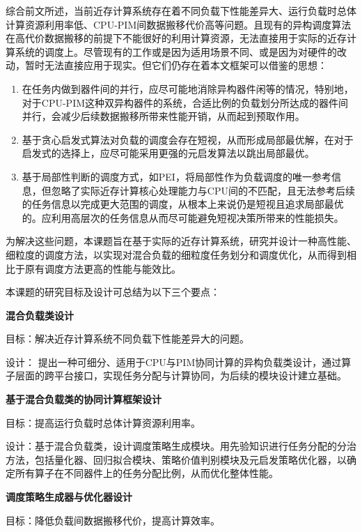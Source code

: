     综合前文所述，当前近存计算系统存在着不同负载下性能差异大、运行负载时总体计算资源利用率低、CPU-PIM间数据搬移代价高等问题。且现有的异构调度算法在高代价数据搬移的前提下不能很好的利用计算资源，无法直接用于实际的近存计算系统的调度上。尽管现有的工作或是因为适用场景不同、或是因为对硬件的改动，暂时无法直接应用于现实。但它们仍存在着本文框架可以借鉴的思想：
    \begin{enumerate}
        \item 在任务内做到器件间的并行，应尽可能地消除异构器件闲等的情况，特别地，对于CPU-PIM这种双异构器件的系统，合适比例的负载划分所达成的器件间并行，会减少后续数据搬移所带来性能开销，从而起到预取作用。
        \item 基于贪心启发式算法对负载的调度会存在短视，从而形成局部最优解，在对于启发式的选择上，应尽可能采用更强的元启发算法以跳出局部最优。
        \item 基于局部性判断的调度方式，如PEI\citep{ahn_pim-enabled_2015}，将局部性作为负载调度的唯一参考信息，但忽略了实际近存计算核心处理能力与CPU间的不匹配，且无法参考后续的任务信息以完成更大范围的调度，从根本上来说仍是短视且追求局部最优的。应利用高层次的任务信息从而尽可能避免短视决策所带来的性能损失。 
    \end{enumerate}
    
    为解决这些问题，本课题旨在基于实际的近存计算系统，研究并设计一种高性能、细粒度的调度方法，以实现对混合负载的细粒度任务划分和调度优化，从而得到相比于原有调度方法更高的性能与能效比。
    
    
    本课题的研究目标及设计可总结为以下三个要点：

    \textbf{混合负载类设计}
    
        目标：解决近存计算系统不同负载下性能差异大的问题。
        
        设计： 提出一种可细分、适用于CPU与PIM协同计算的异构负载类设计，通过算子层面的跨平台接口，实现任务分配与计算协同，为后续的模块设计建立基础。

    \textbf{基于混合负载类的协同计算框架设计}
    
        目标：提高运行负载时总体计算资源利用率。
        
        设计：基于混合负载类，设计调度策略生成模块。用先验知识进行任务分配的分治方法，包括量化器、回归拟合模块、策略价值判别模块及元启发策略优化器，以确定所有算子在不同器件上的任务分配比例，从而优化整体性能。

    \textbf{调度策略生成器与优化器设计}
        
        目标：降低负载间数据搬移代价，提高计算效率。
        
